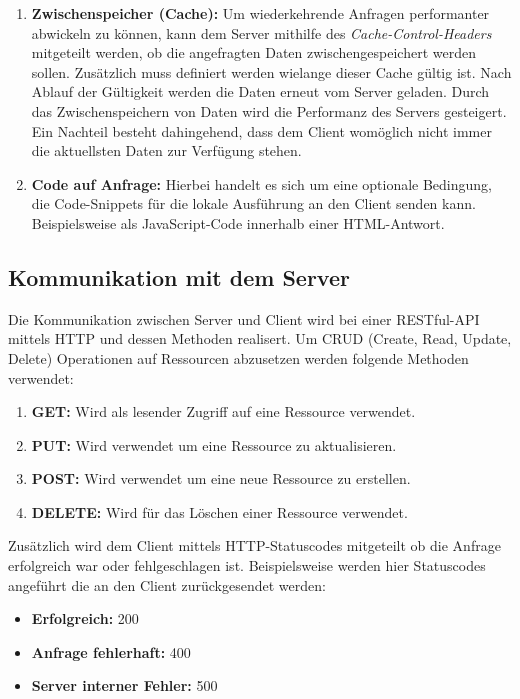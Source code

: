 \begin{enumerate}
    \item \textbf{Zwischenspeicher (Cache): }
    Um wiederkehrende Anfragen performanter abwickeln zu können, kann dem Server mithilfe des \textit{Cache-Control-Headers} mitgeteilt werden, ob die angefragten Daten zwischengespeichert werden sollen.
    Zusätzlich muss definiert werden wielange dieser Cache gültig ist. Nach Ablauf der Gültigkeit werden die Daten erneut vom Server geladen.
    Durch das Zwischenspeichern von Daten wird die Performanz des Servers gesteigert. Ein Nachteil besteht dahingehend, dass dem Client womöglich nicht immer die aktuellsten Daten zur Verfügung stehen.
    \item \textbf{Code auf Anfrage: }
    Hierbei handelt es sich um eine optionale Bedingung, die Code-Snippets für die lokale Ausführung an den Client senden kann. Beispielsweise als JavaScript-Code innerhalb einer HTML-Antwort.
\end{enumerate}

\subsection{Kommunikation mit dem Server}
Die Kommunikation zwischen Server und Client wird bei einer RESTful-API mittels HTTP und dessen Methoden realisert.
Um CRUD (Create, Read, Update, Delete) Operationen auf Ressourcen abzusetzen werden folgende Methoden verwendet:
\begin{enumerate}
    \item \textbf{GET: }Wird als lesender Zugriff auf eine Ressource verwendet.
    \item \textbf{PUT: }Wird verwendet um eine Ressource zu aktualisieren.
    \item \textbf{POST: }Wird verwendet um eine neue Ressource zu erstellen.
    \item \textbf{DELETE: }Wird für das Löschen einer Ressource verwendet.
\end{enumerate}

Zusätzlich wird dem Client mittels HTTP-Statuscodes mitgeteilt ob die Anfrage erfolgreich war oder fehlgeschlagen ist. Beispielsweise werden hier Statuscodes angeführt die an den Client zurückgesendet werden:
\begin{itemize}
    \item \textbf{Erfolgreich:} 200
    \item \textbf{Anfrage fehlerhaft:} 400
    \item \textbf{Server interner Fehler:} 500
\end{itemize}

